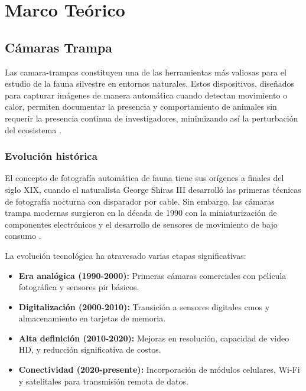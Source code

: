 \documentclass[a4paper, 12pt]{report}
\begin{document}
\chapter{Marco Teórico}

\section{Cámaras Trampa}

Las \glspl{camara-trampa} constituyen una de las herramientas más valiosas para
el estudio de la fauna silvestre en entornos naturales. Estos dispositivos,
diseñados para capturar imágenes de manera automática cuando detectan movimiento
o calor, permiten documentar la presencia y comportamiento de animales sin
requerir la presencia continua de investigadores, minimizando así la
perturbación del ecosistema \cite{steenweg2017scaling}.

\subsection{Evolución histórica}

El concepto de fotografía automática de fauna tiene sus orígenes a finales del
siglo XIX, cuando el naturalista George Shiras III desarrolló las primeras
técnicas de fotografía nocturna con disparador por cable. Sin embargo, las
cámaras trampa modernas surgieron en la década de 1990 con la miniaturización
de componentes electrónicos y el desarrollo de sensores de movimiento de bajo
consumo \cite{kucera2011century}.

La evolución tecnológica ha atravesado varias etapas significativas:
\begin{itemize}
  \item \textbf{Era analógica (1990-2000):} Primeras cámaras comerciales con
    película fotográfica y sensores \gls{pir} básicos.
  \item \textbf{Digitalización (2000-2010):} Transición a sensores digitales
    \gls{cmos} y almacenamiento en tarjetas de memoria.
  \item \textbf{Alta definición (2010-2020):} Mejoras en resolución, capacidad
    de video HD, y reducción significativa de costos.
  \item \textbf{Conectividad (2020-presente):} Incorporación de módulos
    celulares, Wi-Fi y satelitales para transmisión remota de datos.
\end{itemize}
\end{document}
